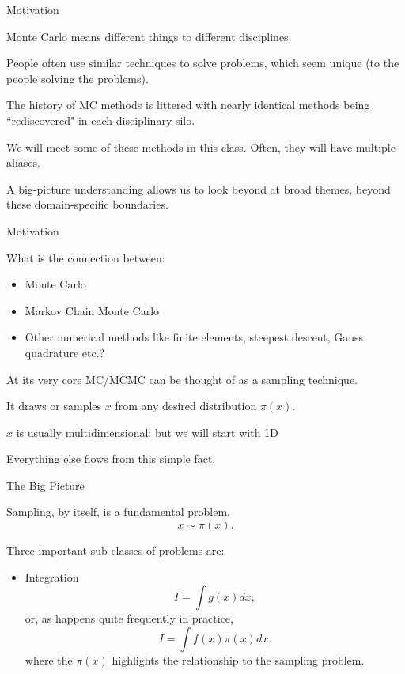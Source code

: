 \documentclass[xcolor=dvipsnames,onlymath,12pt,handout]{beamer}
\newcommand{\highlight}[1]{\textcolor{BrickRed}{#1}}
\begin{document}
\begin{frame}{Motivation}

Monte Carlo means different things to different disciplines.

\pause
\medskip

People often use similar techniques to solve problems, which seem unique (to the people solving the problems).

\pause
\medskip

The history of MC methods is littered with nearly identical methods being  ``rediscovered" in each disciplinary silo.

\pause
\medskip

We will meet some of these methods in this class. Often, they will have multiple aliases.

\pause
\medskip

A big-picture understanding allows us to look beyond at broad themes, beyond these domain-specific boundaries.


\end{frame}

\begin{frame}{Motivation}

What is the connection between:
\begin{itemize}
\item Monte Carlo
\pause
\item Markov Chain Monte Carlo
\pause
\item Other numerical methods like finite elements, steepest descent, Gauss quadrature etc.?
\end{itemize}

\medskip
\pause

At its very core MC/MCMC can be thought of as a \highlight{sampling} technique.
\pause

\medskip

It draws or samples $x$ from any desired distribution $\pi(x)$.
\pause

\medskip

$x$ is usually multidimensional; but we will start with 1D
\pause
\medskip

Everything else flows from this simple fact.

\end{frame}

\begin{frame}{The Big Picture}

\highlight{Sampling}, by itself, is a fundamental problem.
$$x \sim \pi(x).$$

\pause

Three important sub-classes of problems are:

\pause

\begin{itemize}
\item \highlight{Integration}
$$I = \int g(x) dx,$$
\pause
or, as happens quite frequently in practice,
$$I = \int f(x) \pi(x) dx.$$
where the $\pi(x)$ highlights the relationship to the sampling problem.
\end{itemize}
\end{frame}
\end{document}
